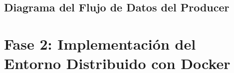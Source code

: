 \documentclass[12pt,a4paper]{article}
\begin{document}
\subsection{Diagrama del Flujo de Datos del Producer}





\section{Fase 2: Implementación del Entorno Distribuido con Docker}
\end{document}
